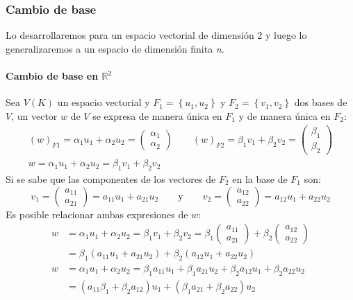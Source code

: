 \subsubsection{Cambio de base}

Lo desarrollaremos para un espacio vectorial de dimensión 2 y luego lo generalizaremos a un espacio de dimensión finita \textit{n}.

\paragraph{Cambio de base en \(\mathbb{R}^2\)}

Sea \(V(K)\) un espacio vectorial y \(F_1 = \left\{u_1, u_2\right\}\) y \(F_2 = \left\{v_1, v_2\right\}\) dos bases de \(V\), un vector \(w\) de \(V\) se expresa de manera única en \(F_1\) y de manera única en \(F_2\):
\begin{gather*}
  (w)_{F1} = \alpha_1 u_1 + \alpha_2 u_2 = \begin{pmatrix}
    \alpha_1 \\ \alpha_2
  \end{pmatrix} \qquad (w)_{F2} = \beta_1 v_1 + \beta_2 v_2 = \begin{pmatrix}
    \beta_1 \\ \beta_2
  \end{pmatrix} \\[3pt]
  w = \alpha_1 u_1 + \alpha_2 u_2 = \beta_1 v_1 + \beta_2 v_2
\end{gather*}
Si se sabe que las componentes de los vectores de \(F_2\) en la base de \(F_1\) son: 
\[
  v_1 = \begin{pmatrix}
    a_{11} \\ a_{21}
  \end{pmatrix} = a_{11} u_1 + a_{21} u_2 \qquad \text{y} \qquad v_2 = \begin{pmatrix}
    a_{12} \\ a_{22}
  \end{pmatrix} = a_{12} u_1 + a_{22} u_2
\]
Es posible relacionar ambas expresiones de \(w\):
\begin{align*}
  w &= \alpha_1 u_1 + \alpha_2 u_2 = \beta_1 v_1 + \beta_2 v_2 = \beta_1 \begin{pmatrix}
    a_{11} \\ a_{21}
  \end{pmatrix} + \beta_2 \begin{pmatrix}
    a_{12} \\ a_{22}
  \end{pmatrix} \\
  &= \beta_1 (a_{11} u_1 + a_{21}u_2) + \beta_2 (a_{12}u_1 + a_{22}u_2)\\[5pt]
  w &= \alpha_1 u_1 + \alpha_2 u_2 = \beta_1 a_{11} u_1 + \beta_1 a_{21} u_2 + \beta_2 a_{12}u_1 + \beta_2 a_{22}u_2\\
  &= (a_{11}\beta_1 + \beta_2 a_{12}) u_1 + (\beta_1 a_{21} + \beta_2 a_{22}) u_2
\end{align*}
